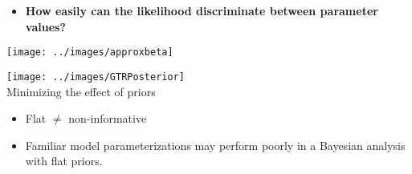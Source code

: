 \documentclass{seminar}
\begin{document}
\begin{slide}
\begin{itemize}
\begin{itemize}
			\item {\bf How easily can the likelihood discriminate between parameter values?}
		\end{itemize}
\end{itemize}
\newslide
{\texttt{[image: ../images/approxbeta]}}
\newslide

%

\newslide
{}
\newslide
{}
\newslide
{}
\newslide
\texttt{[image: ../images/GTRPosterior]}\\
\newslide
	Minimizing the effect of priors
\begin{itemize}
	\item Flat $\neq$ non-informative
	\item Familiar model parameterizations may perform poorly in a Bayesian analysis with flat priors.
\end{itemize}
	

\end{slide}
\end{document}
